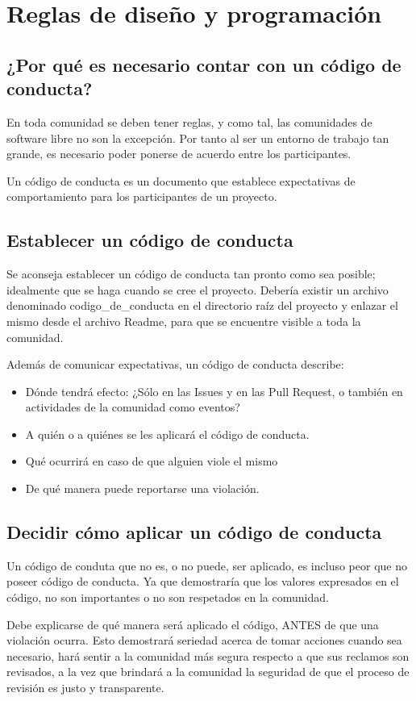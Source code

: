 \chapter{Reglas de diseño y programación}

\section{¿Por qué es necesario contar con un código de conducta?}

{En toda comunidad se deben tener reglas, y como tal, las comunidades de software libre no son la excepción. Por tanto al ser un entorno de trabajo tan grande, es necesario poder ponerse de acuerdo entre los participantes.

Un código de conducta es un documento que establece expectativas de comportamiento para los participantes de un proyecto.}

\section{Establecer un código de conducta}

{Se aconseja establecer un código de conducta tan pronto como sea posible; idealmente que se haga cuando se cree el proyecto. Debería existir un archivo denominado codigo\_de\_conducta en el directorio raíz del proyecto y enlazar el mismo desde el archivo Readme, para que se encuentre visible a toda la comunidad.

Además de comunicar expectativas, un código de conducta describe: }

\begin{itemize}
	\item Dónde tendrá efecto: ¿Sólo en las Issues y en las Pull Request, o también en actividades de la comunidad como eventos?
	\item A quién o a quiénes se les aplicará el código de conducta.
	\item Qué ocurrirá en caso de que alguien viole el mismo
	\item De qué manera puede reportarse una violación.
\end{itemize}

\section{Decidir cómo aplicar un código de conducta}

{Un código de conduta que no es, o no puede, ser aplicado, es incluso peor que no poseer código de conducta. Ya que demostraría que los valores expresados en el código, no son importantes o no son respetados en la comunidad. 

Debe explicarse de qué manera será aplicado el código, ANTES de que una violación ocurra. Esto demostrará seriedad acerca de tomar acciones cuando sea necesario, hará sentir a la comunidad más segura respecto a que sus reclamos son revisados, a la vez que brindará a la comunidad la seguridad de que el proceso de revisión es justo y transparente.}


